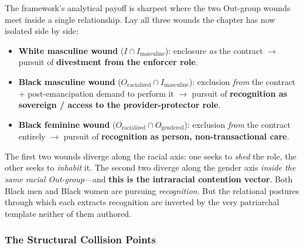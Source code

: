 The framework's analytical payoff is sharpest where the two Out-group wounds meet inside a single relationship. Lay all three wounds the chapter has now isolated side by side:

\begin{itemize}
    \item \textbf{White masculine wound} ($I \cap I_{\text{masculine}}$): enclosure \textit{as} the contract $\rightarrow$ pursuit of \textbf{divestment from the enforcer role}.
    \item \textbf{Black masculine wound} ($O_{\text{racialized}} \cap I_{\text{masculine}}$): exclusion \textit{from} the contract + post-emancipation demand to perform it $\rightarrow$ pursuit of \textbf{recognition as sovereign / access to the provider-protector role}.
    \item \textbf{Black feminine wound} ($O_{\text{racialized}} \cap O_{\text{gendered}}$): exclusion \textit{from} the contract entirely $\rightarrow$ pursuit of \textbf{recognition as person, non-transactional care}.
\end{itemize}

The first two wounds diverge along the racial axis: one seeks to \textit{shed} the role, the other seeks to \textit{inhabit} it. The second two diverge along the gender axis \textit{inside the same racial Out-group}---and \textbf{this is the intraracial contention vector}. Both Black men and Black women are pursuing \textit{recognition}. But the relational postures through which each extracts recognition are inverted by the very patriarchal template neither of them authored.

\subsubsection*{The Structural Collision Points}

